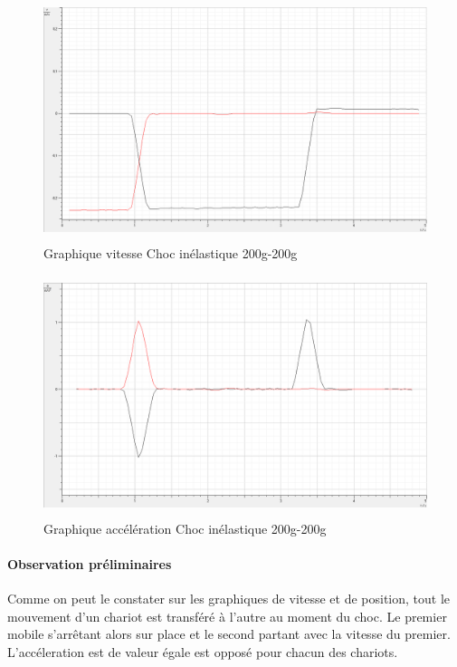 \begin{figure}[h]
    \caption[Graphique vitesse Choc élastique 200g-200g]{Graphique vitesse Choc inélastique 200g-200g}
    \centering
    \includegraphics[height=19em]{Data/200-200ela02v.png}
\end{figure}

\newpage

\begin{figure}[h]
    \caption[Graphique accélération Choc élastique 200g-200g]{Graphique accélération Choc inélastique 200g-200g}
    \centering
    \includegraphics[height=19em]{Data/200-200ela02a.png}
\end{figure}

\paragraph{Observation préliminaires}

Comme on peut le constater sur les graphiques de vitesse et de position, tout le mouvement d'un chariot est transféré à l'autre au moment du choc. Le premier mobile s'arrêtant alors sur place et le second partant avec la vitesse du premier. L'accéleration est de valeur égale est opposé pour chacun des chariots.

